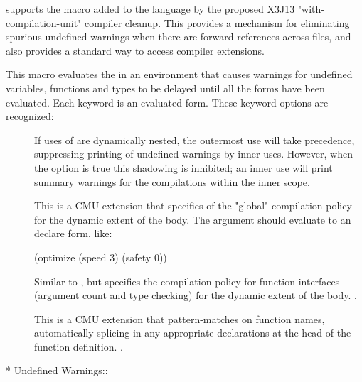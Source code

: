 \cmucl{} supports the  macro added to the language by
the proposed X3J13 "with-compilation-unit" compiler cleanup.  This provides a
mechanism for eliminating spurious undefined warnings when there are forward
references across files, and also provides a standard way to access compiler
extensions.


This macro evaluates the  in an environment that causes warnings for
undefined variables, functions and types to be delayed until all the forms have
been evaluated.  Each keyword  is an evaluated form.  These keyword
options are recognized:
\begin{description}

\item[]
If uses of  are dynamically nested, the outermost
use will take precedence, suppressing printing of undefined warnings by inner
uses.  However, when the  option is true this shadowing is
inhibited; an inner use will print summary warnings for the compilations within
the inner scope.

\item[]
This is a CMU extension that specifies of the "global" compilation policy for
the dynamic extent of the body.  The argument should evaluate to an
 declare form, like:
\begin{lisp}
(optimize (speed 3) (safety 0))
\end{lisp}

\item[]
Similar to , but specifies the compilation policy for function
interfaces (argument count and type checking) for the dynamic extent of the
body.  .

\item[]
This is a CMU extension that pattern-matches on function names, automatically
splicing in any appropriate declarations at the head of the function
definition.  .
\end{description}
\enddefmac

\begin{menu}
* Undefined Warnings::          
\end{menu}

